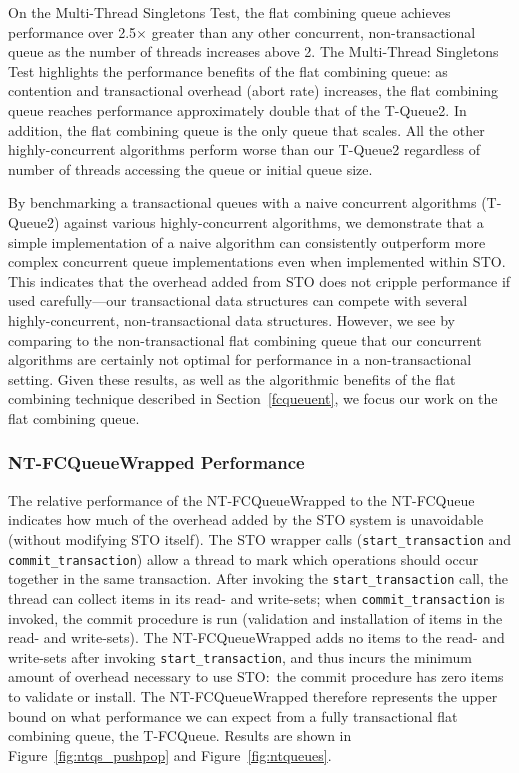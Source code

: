  On the Multi-Thread Singletons Test, the flat combining queue achieves performance over 2.5$\times$ greater than any other concurrent, non-transactional queue as the number of threads increases above 2. The Multi-Thread Singletons Test highlights the performance benefits of the flat combining queue: as contention and transactional overhead (abort rate) increases, the flat combining queue reaches performance approximately double that of the T-Queue2. In addition, the flat combining queue is the only queue that scales. All the other highly-concurrent algorithms perform worse than our T-Queue2 regardless of number of threads accessing the queue or initial queue size.

By benchmarking a transactional queues with a naive concurrent algorithms (T-Queue2) against various highly-concurrent algorithms, we demonstrate that a simple implementation of a naive algorithm can consistently outperform more complex concurrent queue implementations even when implemented within STO. This indicates that the overhead added from STO does not cripple performance if used carefully---our transactional data structures can compete with several highly-concurrent, non-transactional data structures. However, we see by comparing to the non-transactional flat combining queue that our concurrent algorithms are certainly not optimal for performance in a non-transactional setting.
Given these results, as well as the algorithmic benefits of the flat combining technique described in Section~\ref{fcqueuent}, we focus our work on the flat combining queue.



\subsubsection{NT-FCQueueWrapped Performance}
The relative performance of the NT-FCQueueWrapped to the NT-FCQueue indicates how much of the overhead added by the STO system is unavoidable (without modifying STO itself). The STO wrapper calls (\texttt{start\_transaction} and \texttt{commit\_transaction}) allow a thread to mark which operations should occur together in the same transaction. After invoking the \texttt{start\_transaction} call, the thread can collect items in its read- and write-sets; when \texttt{commit\_transaction} is invoked, the commit procedure is run (validation and installation of items in the read- and write-sets). The NT-FCQueueWrapped adds no items to the read- and write-sets after invoking \texttt{start\_transaction}, and thus incurs the minimum amount of overhead necessary to use STO:\ the commit procedure has zero items to validate or install. The NT-FCQueueWrapped therefore represents the upper bound on what performance we can expect from a fully transactional flat combining queue, the T-FCQueue. 
Results are shown in Figure~\ref{fig:ntqs_pushpop} and Figure~\ref{fig:ntqueues}. 


